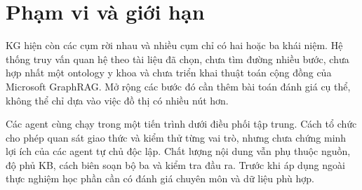 
\section{Phạm vi và giới hạn}
KG hiện còn các cụm rời nhau và nhiều cụm chỉ có hai hoặc ba khái niệm. Hệ thống truy vấn quan hệ theo tài liệu đã chọn, chưa tìm đường nhiều bước, chưa hợp nhất một ontology y khoa và chưa triển khai thuật toán cộng đồng của Microsoft GraphRAG. Mở rộng các bước đó cần thêm bài toán đánh giá cụ thể, không thể chỉ dựa vào việc đồ thị có nhiều nút hơn.

Các agent cùng chạy trong một tiến trình dưới điều phối tập trung. Cách tổ chức cho phép quan sát giao thức và kiểm thử từng vai trò, nhưng chưa chứng minh lợi ích của các agent tự chủ độc lập. Chất lượng nội dung vẫn phụ thuộc nguồn, độ phủ KB, cách biên soạn bộ ba và kiểm tra đầu ra. Trước khi áp dụng ngoài thực nghiệm học phần cần có đánh giá chuyên môn và dữ liệu phù hợp.
